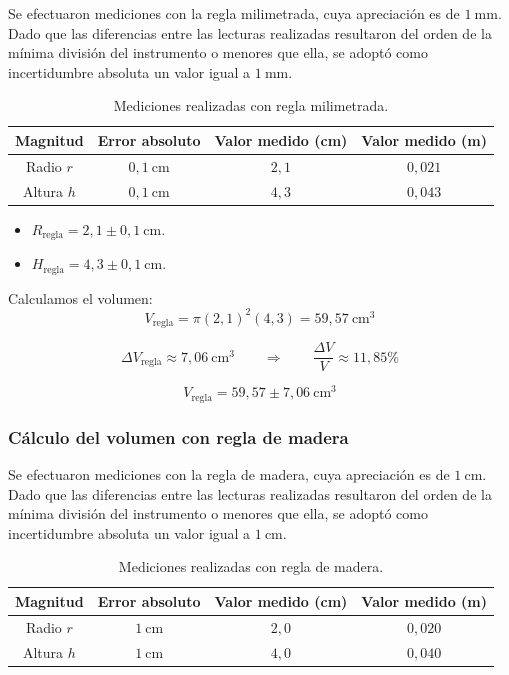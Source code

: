 Se efectuaron mediciones con la regla milimetrada, cuya apreciación es de $1\ \mathrm{mm}$. Dado que las diferencias entre las lecturas realizadas resultaron del orden de la mínima división del instrumento o menores que ella, se adoptó como incertidumbre absoluta un valor igual a $1\ \mathrm{mm}$.

\begin{table}[h!]
\centering
\begin{tabular}{|c|c|c|c|}
\hline
\textbf{Magnitud} & \textbf{Error absoluto} & \textbf{Valor medido (cm)} & \textbf{Valor medido (m)} \\ \hline
Radio $r$ & $0{,}1\ \mathrm{cm}$ & $2{,}1$ & $0{,}021$ \\ \hline
Altura $h$ & $0{,}1\ \mathrm{cm}$ & $4{,}3$ & $0{,}043$ \\ \hline
\end{tabular}
\caption{Mediciones realizadas con regla milimetrada.}
\end{table}

\begin{itemize}
    \item $R_{\text{regla}} = 2{,}1 \pm 0{,}1\ \text{cm}$.
    \item $H_{\text{regla}} = 4{,}3 \pm 0{,}1\ \text{cm}$.
\end{itemize}

Calculamos el volumen:
\[
V_{\text{regla}} = \pi (2{,}1)^2 (4{,}3) = 59{,}57\ \text{cm}^3
\]

\[
\Delta V_{\text{regla}} \approx 7{,}06\ \text{cm}^3
\qquad \Rightarrow \qquad
\frac{\Delta V}{V} \approx 11{,}85\%
\]

\[
V_{\text{regla}} = 59{,}57 \pm 7{,}06\ \text{cm}^3
\]


\subsubsection{Cálculo del volumen con regla de madera}

Se efectuaron mediciones con la regla de madera, cuya apreciación es de $1\ \mathrm{cm}$. Dado que las diferencias entre las lecturas realizadas resultaron del orden de la mínima división del instrumento o menores que ella, se adoptó como incertidumbre absoluta un valor igual a $1\ \mathrm{cm}$.

\begin{table}[h!]
\centering
\begin{tabular}{|c|c|c|c|}
\hline
\textbf{Magnitud} & \textbf{Error absoluto} & \textbf{Valor medido (cm)} & \textbf{Valor medido (m)} \\ \hline
Radio $r$ & $1\ \mathrm{cm}$ & $2{,}0$ & $0{,}020$ \\ \hline
Altura $h$ & $1\ \mathrm{cm}$ & $4{,}0$ & $0{,}040$ \\ \hline
\end{tabular}
\caption{Mediciones realizadas con regla de madera.}
\end{table}

